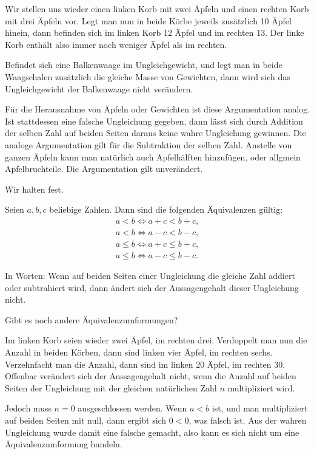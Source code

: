 Wir stellen uns wieder einen linken Korb mit zwei Äpfeln und
einen rechten Korb mit drei Äpfeln vor. Legt man nun in beide
Körbe jeweils zusätzlich 10 Äpfel hinein, dann befinden sich
im linken Korb 12 Äpfel und im rechten 13. Der linke Korb
enthält also immer noch weniger Äpfel als im rechten.

Befindet sich eine Balkenwaage im Ungleichgewicht, und legt man
in beide Waagschalen zusätzlich die gleiche Masse von Gewichten,
dann wird sich das Ungleichgewicht der Balkenwaage nicht verändern.

Für die Herausnahme von Äpfeln oder Gewichten ist diese Argumentation
analog. Ist stattdessen eine falsche Ungleichung gegeben,
dann lässt sich durch Addition der selben Zahl auf beiden Seiten
daraus keine wahre Ungleichung gewinnen. Die analoge Argumentation
gilt für die Subtraktion der selben Zahl. Anstelle von ganzen
Äpfeln kann man natürlich auch Apfelhälften hinzufügen, oder
allgmein Apfelbruchteile. Die Argumentation gilt unverändert.

Wir halten fest. 

\begin{Satz}
Seien $a,b,c$ beliebige Zahlen. Dann sind die folgenden
Äquivalenzen gültig:
\begin{gather}
\label{lt-add} a<b\iff a+c<b+c,\\
\label{lt-sub} a<b\iff a-c<b-c,\\
\label{le-add} a\le b\iff a+c\le b+c,\\
\label{le-sub} a\le b\iff a-c\le b-c.
\end{gather}
\end{Satz}

\noindent
In Worten: Wenn auf beiden Seiten einer Ungleichung die gleiche
Zahl addiert oder subtrahiert wird, dann ändert sich der Aussagengehalt
dieser Ungleichung nicht.

Gibt es noch andere Äquivalenzumformungen?

Im linken Korb seien wieder zwei Äpfel, im rechten drei. Verdoppelt
man nun die Anzahl in beiden Körben, dann sind linken vier Äpfel,
im rechten sechs. Verzehnfacht man die Anzahl, dann sind im linken
20 Äpfel, im rechten 30. Offenbar verändert sich der Aussagengehalt
nicht, wenn die Anzahl auf beiden Seiten der Ungleichung mit
der gleichen natürlichen Zahl $n$ multipliziert wird.

Jedoch muss $n=0$ ausgeschlossen werden. Wenn $a<b$ ist, und man
multipliziert auf beiden Seiten mit null, dann ergibt sich
$0<0$, was falsch ist. Aus der wahren Ungleichung wurde damit eine
falsche gemacht, also kann es sich nicht um eine Äquivalenzumformung
handeln.

